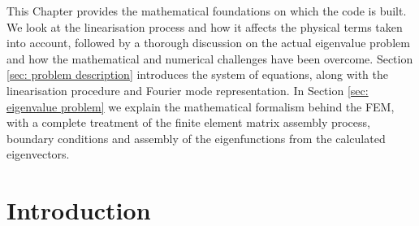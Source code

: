 This Chapter provides the mathematical foundations on which the {\legolas} code is built. We look at the linearisation process and how it affects the physical terms taken into account, followed by a thorough discussion on the actual eigenvalue problem and how the mathematical and numerical challenges have been overcome.
Section \ref{sec: problem description} introduces the system of equations, along with the linearisation procedure and Fourier mode representation. In Section \ref{sec: eigenvalue problem} we explain the mathematical formalism behind the \gls{FEM}, with a complete treatment of the finite element matrix assembly process, boundary conditions and assembly of the eigenfunctions from the calculated eigenvectors.

\section{Introduction}
